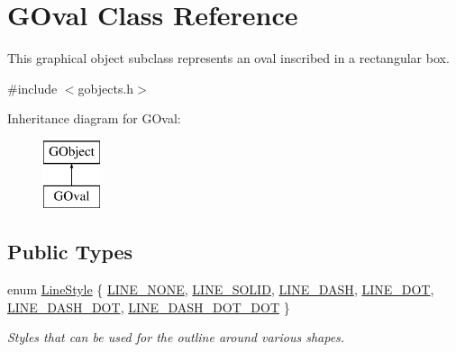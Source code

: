 \hypertarget{classsgl_1_1GOval}{}\section{G\+Oval Class Reference}
\label{classsgl_1_1GOval}


This graphical object subclass represents an oval inscribed in a rectangular box.  




{\ttfamily \#include $<$gobjects.\+h$>$}

Inheritance diagram for G\+Oval\+:\begin{figure}[H]
\begin{center}
\leavevmode
\includegraphics[height=2.000000cm]{classsgl_1_1GOval}
\end{center}
\end{figure}
\subsection*{Public Types}
\begin{DoxyCompactItemize}
\item 
enum \mbox{\hyperlink{classsgl_1_1GObject_a86e0f5648542856159bb40775c854aa7}{Line\+Style}} \{ \mbox{\hyperlink{classsgl_1_1GObject_a86e0f5648542856159bb40775c854aa7acbc84bd5232621834ed31f44d457c1eb}{L\+I\+N\+E\+\_\+\+N\+O\+NE}}, 
\mbox{\hyperlink{classsgl_1_1GObject_a86e0f5648542856159bb40775c854aa7a700c78bc2cd76acaab26651bf7b4941f}{L\+I\+N\+E\+\_\+\+S\+O\+L\+ID}}, 
\mbox{\hyperlink{classsgl_1_1GObject_a86e0f5648542856159bb40775c854aa7a9ccba0845f785d81d07b333ae1aad84e}{L\+I\+N\+E\+\_\+\+D\+A\+SH}}, 
\mbox{\hyperlink{classsgl_1_1GObject_a86e0f5648542856159bb40775c854aa7a8e811c096cb941997f0bfda168bb6df3}{L\+I\+N\+E\+\_\+\+D\+OT}}, 
\mbox{\hyperlink{classsgl_1_1GObject_a86e0f5648542856159bb40775c854aa7ada15a2e3d737b2db7706d8300f91b89d}{L\+I\+N\+E\+\_\+\+D\+A\+S\+H\+\_\+\+D\+OT}}, 
\mbox{\hyperlink{classsgl_1_1GObject_a86e0f5648542856159bb40775c854aa7aabf4053a73eafa7ba2b7e6d664c74c1d}{L\+I\+N\+E\+\_\+\+D\+A\+S\+H\+\_\+\+D\+O\+T\+\_\+\+D\+OT}}
 \}
\begin{DoxyCompactList}\small\item\em Styles that can be used for the outline around various shapes. \end{DoxyCompactList}\end{DoxyCompactItemize}
